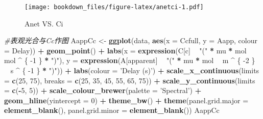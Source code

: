 \documentclass[
]{krantz}
\makeatletter
\newenvironment{Shaded}{\begin{snugshade}}{\end{snugshade}}
\newcommand{\CommentTok}[1]{\textcolor[rgb]{0.56,0.35,0.01}{\textit{#1}}}
\newcommand{\DataTypeTok}[1]{\textcolor[rgb]{0.13,0.29,0.53}{#1}}
\newcommand{\DecValTok}[1]{\textcolor[rgb]{0.00,0.00,0.81}{#1}}
\newcommand{\KeywordTok}[1]{\textcolor[rgb]{0.13,0.29,0.53}{\textbf{#1}}}
\newcommand{\NormalTok}[1]{#1}
\newcommand{\OperatorTok}[1]{\textcolor[rgb]{0.81,0.36,0.00}{\textbf{#1}}}
\newcommand{\StringTok}[1]{\textcolor[rgb]{0.31,0.60,0.02}{#1}}
\newenvironment{kframe}{%
\medskip{}
\setlength{\fboxsep}{.8em}
 \def\at@end@of@kframe{}%
 \ifinner\ifhmode%
  \def\at@end@of@kframe{\end{minipage}}%
  \begin{minipage}{\columnwidth}%
 \fi\fi%
 \def\FrameCommand##1{\hskip\@totalleftmargin \hskip-\fboxsep
 \colorbox{shadecolor}{##1}\hskip-\fboxsep
     \hskip-\linewidth \hskip-\@totalleftmargin \hskip\columnwidth}%
 \MakeFramed {\advance\hsize-\width
   \@totalleftmargin\z@ \linewidth\hsize
   \@setminipage}}%
 {\par\unskip\endMakeFramed%
 \at@end@of@kframe}
\renewenvironment{Shaded}{\begin{kframe}}{\end{kframe}}
\makeatother
\begin{document}
\begin{figure}
\centering
\texttt{[image: bookdown\_files/figure-latex/anetci-1.pdf]}
\caption{\label{fig:anetci}Anet VS. Ci}
\end{figure}

\begin{Shaded}
\begin{Highlighting}[]
\CommentTok{#表观光合与Cc作图}
\NormalTok{AappCc <-}\StringTok{ }\KeywordTok{ggplot}\NormalTok{(data, }\KeywordTok{aes}\NormalTok{(}\DataTypeTok{x =}\NormalTok{ Ccfull, }\DataTypeTok{y =}\NormalTok{ Aapp, }\DataTypeTok{colour =}\NormalTok{ Delay)) }\OperatorTok{+}
\StringTok{  }\KeywordTok{geom_point}\NormalTok{() }\OperatorTok{+}
\StringTok{  }\KeywordTok{labs}\NormalTok{(}\DataTypeTok{x =} \KeywordTok{expression}\NormalTok{(C[c] }\OperatorTok{~}\StringTok{ "("} \OperatorTok{*}\StringTok{ }\NormalTok{mu }\OperatorTok{*}\StringTok{ }\NormalTok{mol }\OperatorTok{~}\StringTok{ }\NormalTok{mol }\OperatorTok{^}\StringTok{ }\NormalTok{\{}
    \DecValTok{-1}
\NormalTok{  \} }\OperatorTok{*}\StringTok{ ")"}\NormalTok{),}
  \DataTypeTok{y =} \KeywordTok{expression}\NormalTok{(A[apparent] }\OperatorTok{~}\StringTok{ "("} \OperatorTok{*}\StringTok{ }\NormalTok{mu }\OperatorTok{*}\StringTok{ }\NormalTok{mol }\OperatorTok{~}\StringTok{ }\NormalTok{m }\OperatorTok{^}\StringTok{ }\NormalTok{\{}
    \DecValTok{-2}
\NormalTok{  \} }\OperatorTok{~}\StringTok{ }\NormalTok{s }\OperatorTok{^}\StringTok{ }\NormalTok{\{}
    \DecValTok{-1}
\NormalTok{  \} }\OperatorTok{*}\StringTok{ ")"}\NormalTok{)) }\OperatorTok{+}
\StringTok{  }\KeywordTok{labs}\NormalTok{(}\DataTypeTok{colour =} \StringTok{'Delay (s)'}\NormalTok{) }\OperatorTok{+}
\StringTok{  }\KeywordTok{scale_x_continuous}\NormalTok{(}\DataTypeTok{limits =} \KeywordTok{c}\NormalTok{(}\DecValTok{25}\NormalTok{, }\DecValTok{75}\NormalTok{),}
                     \DataTypeTok{breaks =} \KeywordTok{c}\NormalTok{(}\DecValTok{25}\NormalTok{, }\DecValTok{35}\NormalTok{, }\DecValTok{45}\NormalTok{, }\DecValTok{55}\NormalTok{, }\DecValTok{65}\NormalTok{, }\DecValTok{75}\NormalTok{)) }\OperatorTok{+}
\StringTok{  }\KeywordTok{scale_y_continuous}\NormalTok{(}\DataTypeTok{limits =} \KeywordTok{c}\NormalTok{(}\OperatorTok{-}\DecValTok{5}\NormalTok{, }\DecValTok{5}\NormalTok{)) }\OperatorTok{+}
\StringTok{  }\KeywordTok{scale_colour_brewer}\NormalTok{(}\DataTypeTok{palette =} \StringTok{'Spectral'}\NormalTok{) }\OperatorTok{+}
\StringTok{  }\KeywordTok{geom_hline}\NormalTok{(}\DataTypeTok{yintercept =} \DecValTok{0}\NormalTok{) }\OperatorTok{+}
\StringTok{  }\KeywordTok{theme_bw}\NormalTok{() }\OperatorTok{+}
\StringTok{  }\KeywordTok{theme}\NormalTok{(}\DataTypeTok{panel.grid.major =} \KeywordTok{element_blank}\NormalTok{(),}
        \DataTypeTok{panel.grid.minor =} \KeywordTok{element_blank}\NormalTok{())}
\NormalTok{AappCc}
\end{Highlighting}
\end{Shaded}
\end{document}
